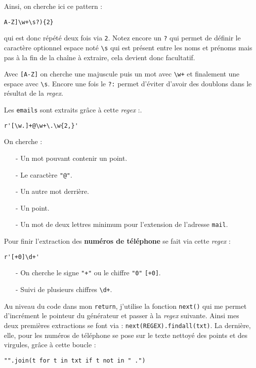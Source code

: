 Ainsi, on cherche ici ce pattern : 
\begin{verbatim}
A-Z]\w+\s?){2}
\end{verbatim}
qui est donc répété deux fois via \texttt{{2}}. Notez encore un \texttt{?} qui permet de définir le caractère optionnel espace noté \texttt{\textbackslash{}s} qui est présent entre les noms et prénoms mais pas à la fin de la chaîne à extraire, cela devient donc facultatif.
\medskip

Avec \texttt{[A-Z]} on cherche une majuscule puis un mot avec \texttt{\textbackslash{}w+} et finalement une espace avec \texttt{\textbackslash{}s}. Encore une fois le \texttt{?:} permet d'éviter d'avoir des doublons dans le résultat de la \textit{regex}.
\medskip

Les \texttt{emails} sont extraits grâce à cette \textit{regex} :.
\begin{verbatim}
r'[\w.]+@\w+\.\w{2,}'
\end{verbatim}
\medskip

On cherche :
\begin{itemize}
	\item[-] Un mot pouvant contenir un point.
	\item[-] Le caractère \texttt{"@"}.
	\item[-] Un autre mot derrière.
	\item[-] Un point.
	\item[-] Un mot de deux lettres minimum pour l'extension de l'adresse \texttt{mail}.
\end{itemize}
\medskip

Pour finir l'extraction des \textbf{numéros de téléphone} se fait via cette \textit{regex} :
\begin{verbatim}
r'[+0]\d+'
\end{verbatim}
\medskip

\begin{itemize}
	\item[-] On cherche le signe \texttt{"+"} ou le chiffre \texttt{"0"} \texttt{[+0]}.
	\item[-] Suivi de plusieurs chiffres \texttt{\textbackslash{}d+}.
\end{itemize}
\medskip

Au niveau du code dans mon \texttt{return}, j'utilise la fonction \texttt{next()} qui me permet d'incrément le pointeur du générateur et passer à la \textit{regex} suivante.
Ainsi mes deux premières extractions se font via : \texttt{next(REGEX).findall(txt)}. La dernière, elle, pour les numéros de téléphone se pose sur le texte nettoyé des points et des virgules, grâce à cette boucle :
\begin{verbatim}
"".join(t for t in txt if t not in " .")
\end{verbatim}
\medskip

